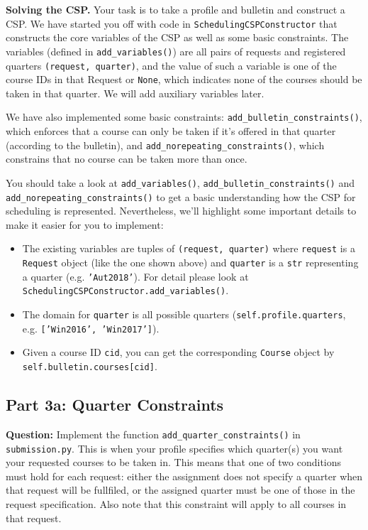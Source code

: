 \documentclass{article}
\theoremstyle{case}
\theoremstyle{definition}
\begin{document}
\textbf{Solving the CSP.} Your task is to take a profile and bulletin and construct a CSP. We have started you off with code in \texttt{SchedulingCSPConstructor} that constructs the core variables of the CSP as well as some basic constraints. The variables (defined in \texttt{add\_variables()}) are all pairs of requests and registered quarters \texttt{(request, quarter)}, and the value of such a variable is one of the course IDs in that Request or \texttt{None}, which indicates none of the courses should be taken in that quarter. We will add auxiliary variables later.

We have also implemented some basic constraints: \texttt{add\_bulletin\_constraints()}, which enforces that a course can only be taken if it's offered in that quarter (according to the bulletin), and \texttt{add\_norepeating\_constraints()}, which constrains that no course can be taken more than once.

You should take a look at \texttt{add\_variables()}, \texttt{add\_bulletin\_constraints()} and \texttt{add\_norepeating\_constraints()} to get a basic understanding how the CSP for scheduling is represented. Nevertheless, we'll highlight some important details to make it easier for you to implement:
\begin{itemize}
    \item The existing variables are tuples of \texttt{(request, quarter)} where \texttt{request} is a \texttt{Request} object (like the one shown above) and \texttt{quarter} is a \texttt{str} representing a quarter (e.g. \texttt{'Aut2018'}). For detail please look at \texttt{SchedulingCSPConstructor.add\_variables()}.
    \item The domain for \texttt{quarter} is all possible quarters (\texttt{self.profile.quarters}, e.g. \texttt{['Win2016', 'Win2017']}).
    \item Given a course ID \texttt{cid}, you can get the corresponding \texttt{Course} object by \texttt{self.bulletin.courses[cid]}.
\end{itemize}

\subsection*{Part 3a: Quarter Constraints}

\textbf{Question:} Implement the function \texttt{add\_quarter\_constraints()} in \texttt{submission.py}. This is when your profile specifies which quarter(s) you want your requested courses to be taken in. This means that one of two conditions must hold for each request: either the assignment does not specify a quarter when that request will be fullfiled, or the assigned quarter must be one of those in the request specification. Also note that this constraint will apply to all courses in that request.
\end{document}
